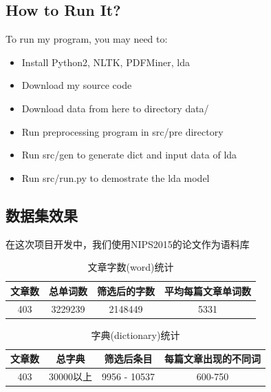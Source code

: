 \documentclass{article}
\begin{document}
\subsection{How to Run It?}
To run my program, you may need to:
\begin{itemize}
	\item	Install Python2, NLTK, PDFMiner, lda
	\item	Download my source code
	\item	Download data from here\cite{2} to directory data/
	\item	Run preprocessing program in src/pre directory
	\item	Run src/gen to generate dict and input data of lda
	\item Run src/run.py to demostrate the lda model
\end{itemize}

\subsection{数据集效果}
在这次项目开发中，我们使用NIPS2015的论文作为语料库

\begin{center}
\begin{table}[!ht]
\centering
\caption{文章字数(word)统计}
\large
\begin{tabular}{|c|c|c|c|}
\hline
文章数 & 总单词数 & 筛选后的字数 & 平均每篇文章单词数\\
\hline
403 & 3229239 & 2148449 & 5331\\
\hline
\end{tabular}
\end{table}


\begin{table}[!ht]
\centering
\caption{字典(dictionary)统计}
\large
\begin{tabular}{|c|c|c|c|}
\hline
文章数 & 总字典 & 筛选后条目 & 每篇文章出现的不同词\\
\hline
403 & 30000以上 & 9956 - 10537 & 600-750\\
\hline
\end{tabular}
\end{table}
\end{center}
\end{document}
